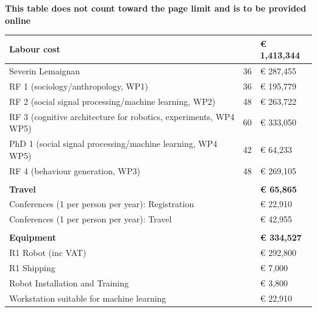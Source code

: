 \documentclass[11pt,a4paper]{report}
\newcommand{\TODO}[1]{{\color{red}\textbf{#1}}}
\begin{document}
\TODO{This table does not count toward the page limit and is to be provided online}
\begin{table}[]
\begin{tabular}{@{}lll@{}}
\toprule
\textbf{Labour cost}                                             & \textbf{} & \textbf{€ 1,413,344} \\ \midrule
Severin Lemaignan                                                & 36        & € 287,455            \\
RF 1 (sociology/anthropology, WP1)                               & 36        & € 195,779            \\
RF 2 (social signal processing/machine learning, WP2)            & 48        & € 263,722            \\
RF 3 (cognitive architecture for robotics, experiments, WP4 WP5) & 60        & € 333,050            \\
PhD 1 (social signal processing/machine learning, WP4 WP5)       & 42        & € 64,233             \\
RF 4 (behaviour generation, WP3)                                 & 48        & € 269,105            \\
                                                                 &           &                      \\
\textbf{Travel}                                                  & \textbf{} & \textbf{€ 65,865}    \\ \midrule
Conferences (1 per person per year): Registration                &           & € 22,910             \\
Conferences (1 per person per year): Travel                      &           & € 42,955             \\
                                                                 &           &                      \\
\textbf{Equipment}                                               & \textbf{} & \textbf{€ 334,527}   \\ \midrule
R1 Robot (inc VAT)                                               &           & € 292,800            \\
R1 Shipping                                                      &           & € 7,000              \\
Robot Installation and Training                                  &           & € 3,800              \\
Workstation suitable for machine learning                        &           & € 22,910             \\

\end{tabular}
\end{table}
\end{document}
